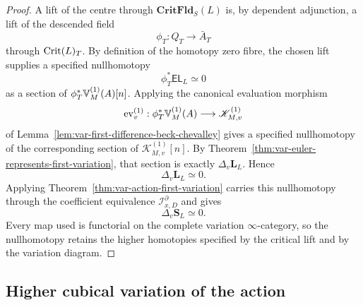 \begin{proof}
A lift of the centre through \(\mathbf{CritFld}_S(L)\) is, by dependent adjunction, a lift of the descended field
\[
    \phi_T:Q_T\to\bar A_T
\]
through \(\operatorname{Crit}(L)_T\). By definition of the homotopy zero fibre, the chosen lift supplies a specified nullhomotopy
\[
    \phi_T^*\mathsf{EL}_L\simeq0
\]
as a section of \(\phi_T^*\mathbb V^{(1)}_M(A)[n]\). Applying the canonical evaluation morphism
\[
    \operatorname{ev}^{(1)}_v:
    \phi_T^*\mathbb V^{(1)}_M(A)
    \longrightarrow
    \mathscr K^{(1)}_{M,v}
\]
of Lemma~\ref{lem:var-first-difference-beck-chevalley} gives a specified nullhomotopy of the corresponding section of \(\mathscr K^{(1)}_{M,v}[n]\). By Theorem~\ref{thm:var-euler-represents-first-variation}, that section is exactly \(\Delta_v\mathbf L_L\). Hence
\[
    \Delta_v\mathbf L_L\simeq0.
\]
Applying Theorem~\ref{thm:var-action-first-variation} carries this nullhomotopy through the coefficient equivalence \(\mathcal I^\partial_{x,D}\) and gives
\[
    \Delta_v\mathbf S_L\simeq0.
\]
Every map used is functorial on the complete variation \(\infty\)-category, so the nullhomotopy retains the higher homotopies specified by the critical lift and by the variation diagram.
\end{proof}

\subsection{Higher cubical variation of the action}
\label{subsec:var-action-higher-variation}

